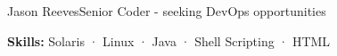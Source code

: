\documentclass{article}
\begin{document}
\begin{cv}[avatar]{Jason Reeves}{Senior Coder - seeking DevOps opportunities}
\begin{cvevent}[Nov 1995][Jan 1997]
  \textbf{Skills:} Solaris · Linux · Java · Shell Scripting · HTML
  \vspace*{5mm}
\end{cvevent}

\end{cv}
\end{document}
